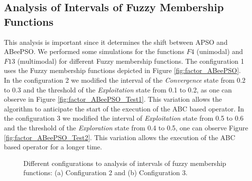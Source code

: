 \subsection{Analysis of Intervals of Fuzzy Membership Functions}
This analysis is important since it determines the shift between APSO and ABeePSO. We performed some simulations for the functions $F4$ (unimodal) and $F13$ (multimodal) for different Fuzzy membership functions. The configuration 1 uses the Fuzzy membership functions depicted in Figure \ref{fig:factor_ABeePSO}. In the configuration 2 we modified the interval of the \emph{Convergence} state from 0.2 to 0.3 and the threshold of the \emph{Exploitation} state from 0.1 to 0.2, as one can observe in Figure \ref{fig:factor_ABeePSO_Test1}. This variation allows the algorithm to anticipate the start of the execution of the ABC based operator. In the configuration 3 we modified the interval of \emph{Exploitation} state from 0.5 to 0.6 and the threshold of the \emph{Exploration} state from 0.4 to 0.5, one can observe Figure \ref{fig:factor_ABeePSO_Test2}. This variation allows the execution of the ABC based operator for a longer time.

\begin{figure}[!h]
\centering
{}
\hspace{1mm}
\caption{\small{Different configurations to analysis of intervals of fuzzy membership functions: (a) Configuration 2 and (b) Configuration 3.}}
\label{fig:Analysis_Fuzzy}
\end{figure}

